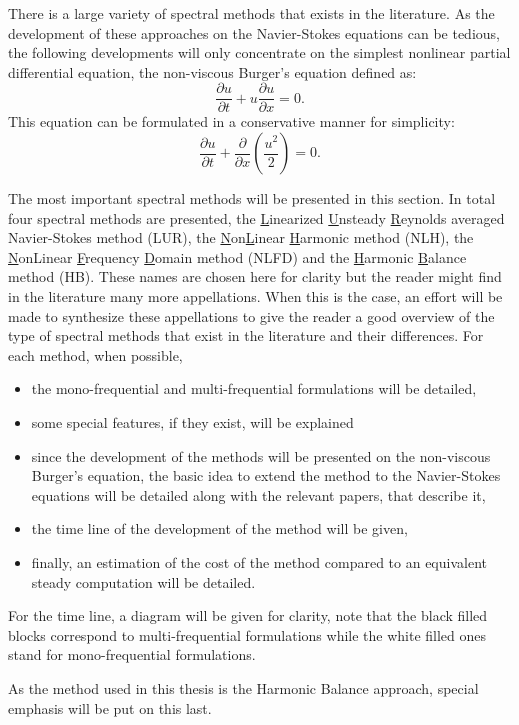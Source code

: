 
There is a large variety of spectral methods that exists in the
literature. 
As the development of these approaches on the Navier-Stokes equations
can be tedious, the following developments 
will only concentrate on the simplest
nonlinear partial differential equation, 
the non-viscous Burger's equation defined as:
\begin{equation}
	\frac{\partial u}{\partial t} + 
	u \frac{\partial u}{\partial x} = 
	0.
	\label{eq:sm_nonlinear_convection}
\end{equation}
This equation can be formulated in a conservative manner for simplicity:
\begin{equation}
	\frac{\partial u}{\partial t} + 
	\frac{\partial}{\partial x} \left( \frac{u^2}{2} \right) = 
	0.
	\label{eq:sm_nonlinear_convection_conservative}
\end{equation}



The most important spectral methods will be presented in this section.
In total four spectral methods are presented, 
the \underline{L}inearized \underline{U}nsteady 
\underline{R}eynolds averaged
Navier-Stokes method (LUR), 
the \underline{N}on\underline{L}inear 
\underline{H}armonic method (NLH), the \underline{N}onLinear 
\underline{F}requency \underline{D}omain
method (NLFD) and the \underline{H}armonic \underline{B}alance 
method (HB).
These names are chosen here
for clarity but the reader might find in the literature many more
appellations. When this is the case, an effort will be made to synthesize
these appellations to give the reader a good 
overview of the type of spectral methods that exist in the literature
and their differences.
For each method, when possible,
\begin{itemize}
 	\item the mono-frequential and multi-frequential 
 	formulations will be detailed,
 	\item some special features, if they exist, will be explained
 	\item since the development of the methods will be 
 	presented on the non-viscous 
 	Burger's equation, 
	the basic idea to extend the method to the Navier-Stokes
	equations will be detailed along with the relevant papers,
	that describe it,
	\item the time line of the development 
	of the method will be given,
	\item finally, an estimation of the cost of the method 
	compared to an equivalent steady computation will be detailed.
\end{itemize}
For the time line, a diagram will be given for clarity, note
that the black filled blocks correspond to multi-frequential
formulations while the white filled ones stand for mono-frequential
formulations.

As the method used in this thesis is the Harmonic Balance approach,
special emphasis will be put on this last.

